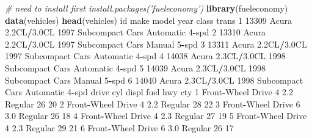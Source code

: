 \documentclass[
]{book}
\newenvironment{Shaded}{\begin{snugshade}}{\end{snugshade}}
\newcommand{\CommentTok}[1]{\textcolor[rgb]{0.56,0.35,0.01}{\textit{#1}}}
\newcommand{\DecValTok}[1]{\textcolor[rgb]{0.00,0.00,0.81}{#1}}
\newcommand{\FloatTok}[1]{\textcolor[rgb]{0.00,0.00,0.81}{#1}}
\newcommand{\KeywordTok}[1]{\textcolor[rgb]{0.13,0.29,0.53}{\textbf{#1}}}
\newcommand{\NormalTok}[1]{#1}
\newcommand{\OperatorTok}[1]{\textcolor[rgb]{0.81,0.36,0.00}{\textbf{#1}}}
\begin{document}
\begin{Shaded}
\begin{Highlighting}[]
\CommentTok{# need to install first install.packages('fueleconomy')}
\KeywordTok{library}\NormalTok{(fueleconomy)}
\KeywordTok{data}\NormalTok{(vehicles)}
\KeywordTok{head}\NormalTok{(vehicles)}
\NormalTok{     id  make       model year           class           trans}
\DecValTok{1} \DecValTok{13309}\NormalTok{ Acura }\FloatTok{2.2}\NormalTok{CL}\OperatorTok{/}\FloatTok{3.0}\NormalTok{CL }\DecValTok{1997}\NormalTok{ Subcompact Cars Automatic }\DecValTok{4}\OperatorTok{-}\NormalTok{spd}
\DecValTok{2} \DecValTok{13310}\NormalTok{ Acura }\FloatTok{2.2}\NormalTok{CL}\OperatorTok{/}\FloatTok{3.0}\NormalTok{CL }\DecValTok{1997}\NormalTok{ Subcompact Cars    Manual }\DecValTok{5}\OperatorTok{-}\NormalTok{spd}
\DecValTok{3} \DecValTok{13311}\NormalTok{ Acura }\FloatTok{2.2}\NormalTok{CL}\OperatorTok{/}\FloatTok{3.0}\NormalTok{CL }\DecValTok{1997}\NormalTok{ Subcompact Cars Automatic }\DecValTok{4}\OperatorTok{-}\NormalTok{spd}
\DecValTok{4} \DecValTok{14038}\NormalTok{ Acura }\FloatTok{2.3}\NormalTok{CL}\OperatorTok{/}\FloatTok{3.0}\NormalTok{CL }\DecValTok{1998}\NormalTok{ Subcompact Cars Automatic }\DecValTok{4}\OperatorTok{-}\NormalTok{spd}
\DecValTok{5} \DecValTok{14039}\NormalTok{ Acura }\FloatTok{2.3}\NormalTok{CL}\OperatorTok{/}\FloatTok{3.0}\NormalTok{CL }\DecValTok{1998}\NormalTok{ Subcompact Cars    Manual }\DecValTok{5}\OperatorTok{-}\NormalTok{spd}
\DecValTok{6} \DecValTok{14040}\NormalTok{ Acura }\FloatTok{2.3}\NormalTok{CL}\OperatorTok{/}\FloatTok{3.0}\NormalTok{CL }\DecValTok{1998}\NormalTok{ Subcompact Cars Automatic }\DecValTok{4}\OperatorTok{-}\NormalTok{spd}
\NormalTok{              drive cyl displ    fuel hwy cty}
\DecValTok{1}\NormalTok{ Front}\OperatorTok{-}\NormalTok{Wheel Drive   }\DecValTok{4}   \FloatTok{2.2}\NormalTok{ Regular  }\DecValTok{26}  \DecValTok{20}
\DecValTok{2}\NormalTok{ Front}\OperatorTok{-}\NormalTok{Wheel Drive   }\DecValTok{4}   \FloatTok{2.2}\NormalTok{ Regular  }\DecValTok{28}  \DecValTok{22}
\DecValTok{3}\NormalTok{ Front}\OperatorTok{-}\NormalTok{Wheel Drive   }\DecValTok{6}   \FloatTok{3.0}\NormalTok{ Regular  }\DecValTok{26}  \DecValTok{18}
\DecValTok{4}\NormalTok{ Front}\OperatorTok{-}\NormalTok{Wheel Drive   }\DecValTok{4}   \FloatTok{2.3}\NormalTok{ Regular  }\DecValTok{27}  \DecValTok{19}
\DecValTok{5}\NormalTok{ Front}\OperatorTok{-}\NormalTok{Wheel Drive   }\DecValTok{4}   \FloatTok{2.3}\NormalTok{ Regular  }\DecValTok{29}  \DecValTok{21}
\DecValTok{6}\NormalTok{ Front}\OperatorTok{-}\NormalTok{Wheel Drive   }\DecValTok{6}   \FloatTok{3.0}\NormalTok{ Regular  }\DecValTok{26}  \DecValTok{17}
\end{Highlighting}
\end{Shaded}
\end{document}
